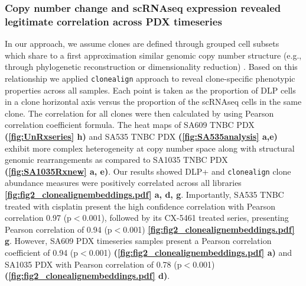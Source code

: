 \subsubsection{Copy number change and scRNAseq expression revealed legitimate correlation across PDX timeseries}
  In our approach, we assume clones are defined through grouped cell subsets which share to a first approximation similar genomic copy number structure (e.g., through phylogenetic reconstruction or dimensionality reduction) \cite{laks2019clonal}. Based on this relationship we applied
  \texttt{clonealign} approach \cite{campbell2019clonealign} to reveal clone-specific phenotypic properties across all samples.
  Each point is taken as the proportion of DLP cells in a clone horizontal axis versus the proportion of the scRNAseq cells in the same clone. The  correlation for all clones were then calculated by using Pearson correlation coefficient formula. The heat maps of SA609 TNBC PDX \textbf{(\autoref{fig:UnRxseries} h)} and SA535 TNBC PDX \textbf{(\autoref{fig:SA535analysis} a,e)} exhibit more complex heterogeneity at copy number space along with structural genomic rearrangements as compared to SA1035 TNBC PDX \textbf{(\autoref{fig:SA1035Rxnew} a, e)}. Our results showed DLP+ and \texttt{clonealign} clone abundance measures were positively correlated across all libraries \textbf{\autoref{fig:fig2_clonealignembeddings.pdf} a, d, g}. Importantly, SA535 TNBC treated with cisplatin present the high confidence correlation with Pearson correlation 0.97 (p$<$0.001), followed by its CX-5461 treated series, presenting Pearson correlation of 0.94 (p$<$0.001) \textbf{\autoref{fig:fig2_clonealignembeddings.pdf} g}. However, SA609 PDX timeseries samples present a Pearson correlation coefficient of 0.94 (p$<$0.001) \textbf{(\autoref{fig:fig2_clonealignembeddings.pdf} a)} and SA1035 PDX with Pearson correlation of 0.78 (p$<$0.001) \textbf{(\autoref{fig:fig2_clonealignembeddings.pdf} d)}.
  
  

